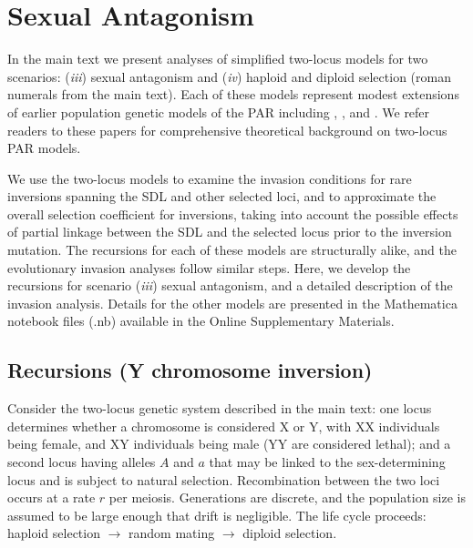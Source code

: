 \documentclass{article}
\begin{document}
 \section{Sexual Antagonism}\label{AppB}
 \renewcommand{\theequation}{B\arabic{equation}}
 \setcounter{equation}{0}
 \renewcommand{\thefigure}{B\arabic{figure}}
 \setcounter{figure}{0}

In the main text we present analyses of simplified two-locus models for two scenarios: ({\itshape iii}) sexual antagonism and ({\itshape iv}) haploid and diploid selection (roman numerals from the main text). Each of these models represent modest extensions of earlier population genetic models of the PAR including \citet{Clark1987}, \citet{Otto2011}, and \citet{Otto2014, Otto2019}. We refer readers to these papers for comprehensive theoretical background on two-locus PAR models. 

We use the two-locus models to examine the invasion conditions for rare inversions spanning the SDL and other selected loci, and to approximate the overall selection coefficient for inversions, taking into account the possible effects of partial linkage between the SDL and the selected locus prior to the inversion mutation. The recursions for each of these models are structurally alike, and the evolutionary invasion analyses follow similar steps. Here, we develop the recursions for scenario ({\itshape iii}) sexual antagonism, and a detailed description of the invasion analysis. Details for the other models are presented in the Mathematica notebook files (.nb) available in the Online Supplementary Materials.


\subsection{Recursions (Y chromosome inversion)}

Consider the two-locus genetic system described in the main text: one locus determines whether a chromosome is considered X or Y, with XX individuals being female, and XY individuals being male (YY are considered lethal); and a second locus having alleles $A$ and $a$ that may be linked to the sex-determining locus and is subject to natural selection. Recombination between the two loci occurs at a rate $r$ per meiosis. Generations are discrete, and the population size is assumed to be large enough that drift is negligible. The life cycle proceeds: haploid selection $\rightarrow$ random mating $\rightarrow$ diploid selection.
\end{document}
